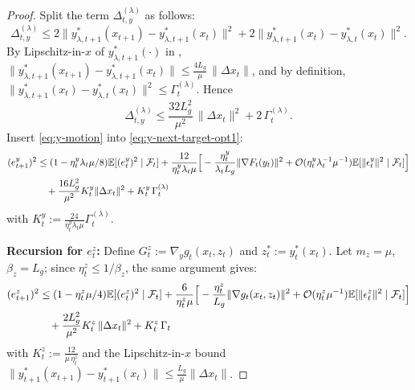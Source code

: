 \documentclass{uai2026} %
\begin{document}
\begin{proof}
Split the term $\Delta^{(\lambda)}_{t,y}$ as follows:
\[
\Delta^{(\lambda)}_{t,y}\le 2\|y^{*}_{\lambda,t+1}(x_{t+1})-y^{*}_{\lambda,t+1}(x_t)\|^2
+2\|y^{*}_{\lambda,t+1}(x_t)-y^{*}_{\lambda,t}(x_t)\|^2.
\]
By Lipschitz-in-$x$ of $y^{*}_{\lambda,t+1}(\cdot)$ in ,
$\|y^{*}_{\lambda,t+1}(x_{t+1})-y^{*}_{\lambda,t+1}(x_t)\|\le \tfrac{4L_g}{\mu}\,\|\Delta x_t\|$, and by definition,
$\|y^{*}_{\lambda,t+1}(x_t)-y^{*}_{\lambda,t}(x_t)\|^2\le \Gamma_t^{(\lambda)}$. Hence
\begin{equation}\label{eq:y-motion}
\Delta^{(\lambda)}_{t,y}\le \frac{32L_g^2}{\mu^2}\,\|\Delta x_t\|^2+2\,\Gamma_t^{(\lambda)}.
\end{equation}
Insert \eqref{eq:y-motion} into \eqref{eq:y-next-target-opt1}:
\begin{align}\label{eq:y-final-opt1}
\MoveEqLeft[4](e_{t+1}^{y})^{2}
\le (1-\eta_{t}^{y}\lambda_{t}\mu/8)\mathbb{E}[(e_{t}^{y})^{2}\mid\mathcal{F}_{t}]
+\frac{12}{\eta_{t}^{y}\lambda_{t}\mu}\Big[-\frac{\eta_{t}^{y}}{\lambda_{t}L_{g}}\|\nabla F_{t}(y_{t})\|^{2}+\mathcal{O}(\eta_{t}^{y}\lambda_{t}^{-1}\mu^{-1})\mathbb{E}[\|\epsilon_{t}^{y}\|^{2}\mid \mathcal{F}_{t}]\Big]\nonumber\\
&+ \frac{16L_g^2}{\mu^2}K_{t}^{y}\|\Delta x_t\|^2+K_{t}^{y}\,\Gamma_t^{(\lambda)}
\end{align}
with $K_{t}^{y}:=\frac{24}{\eta_t^y \lambda_{t}\mu}\Gamma_t^{(\lambda)}$.

\textbf{Recursion for $e_{t}^{z}$:}
Define $G_t^z:=\nabla_y g_t(x_t,z_t)$ and $z_t^{*}:=y_t^{*}(x_t)$. Let $m_z=\mu$, $\beta_z=L_g$; since $\eta_t^z\le 1/\beta_z$,
the same argument gives:
\begin{align}\label{eq:z-final-opt1}
    \MoveEqLeft[4](e_{t+1}^{z})^{2}
\le (1-\eta_{t}^{z}\mu/4)\mathbb{E}[(e_{t}^{z})^{2}\mid\mathcal{F}_{t}]
+\frac{6}{\eta_{t}^{z}\mu}\Big[-\frac{\eta_{t}^{z}}{L_{g}}\|\nabla g_{t}(x_{t},z_{t})\|^{2}+\mathcal{O}(\eta_{t}^{z}\mu^{-1})\mathbb{E}[\|\epsilon_{t}^{z}\|^{2}\mid \mathcal{F}_{t}]\Big]\nonumber\\
&+\frac{2L_g^2}{\mu^2}K_{t}^{z}\,\|\Delta x_t\|^2+K_{t}^{z}\,\Gamma_t
\end{align}
with $K_t^z:=\tfrac{12}{\mu\,\eta_t^z}$ and the Lipschitz-in-$x$ bound
$\|y^{*}_{t+1}(x_{t+1})-y^{*}_{t+1}(x_t)\|\le \tfrac{L_g}{\mu}\|\Delta x_t\|$.


\end{proof}
\end{document}
